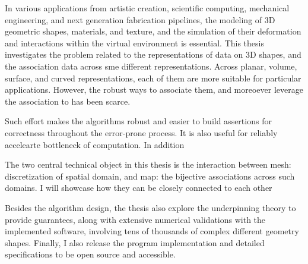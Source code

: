 

In various applications from artistic creation, scientific computing, mechanical engineering, and next generation fabrication pipelines, the modeling of 3D geometric shapes, materials, and texture, and the simulation of their deformation and interactions within the virtual environment is essential.
This thesis investigates the problem related to the representations of data on 3D shapes, and the association data across sme different representations. 
Across planar, volume, surface, and curved representations, each of them are more suitable for particular applications. However, the robust ways to associate them, and moreoever leverage the association to has been scarce.  

Such effort makes the algorithms robust and easier to build assertions for correctness throughout the error-prone process. It is also useful for reliably accelearte bottleneck of computation. In addition

The two central technical object in this thesis is the interaction between mesh: discretization of spatial domain, and map: the bijective associations across such domains. I will showcase how they can be closely connected to each other

Besides the algorithm design, the thesis also explore the underpinning theory to provide guarantees, along with extensive numerical validations with the implemented software, involving tens of thousands of complex different geometry shapes. Finally, I also release the program implementation and detailed specifications to be open source and accessible.
